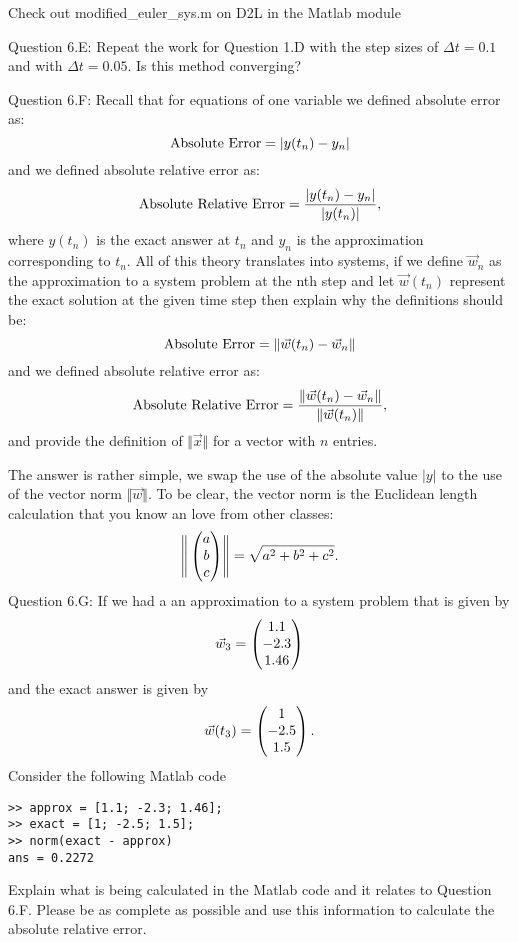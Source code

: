 \documentclass{article}
\def\ds{\displaystyle}
\begin{document}
{\color{teal}Check out modified\_euler\_sys.m on D2L in the Matlab module}
\par \medskip \noindent 
%
Question 6.E: Repeat the work for Question 1.D with the step sizes of $\Delta t = 0.1$ and with $\Delta t = 0.05$. Is this method converging?
\par \medskip \noindent 
%
Question 6.F: Recall that for equations of one variable we defined absolute error as:
$${\rm Absolute \ Error}=\vert y(t_n)-y_n\vert$$
and we defined absolute relative error as:
$${\rm Absolute \ Relative \ Error} =  \frac {\vert y(t_n)-y_n\vert}{\vert y(t_n)\vert},$$
where $\ds y(t_n)$ is the exact answer at $\ds t_n$ and $\ds y_n$ is the approximation corresponding to $\ds t_n$. All of this theory translates into systems, if we define $\ds \vec w_n$ as the approximation to a system problem at the nth step and let $\ds \vec w(t_n)$ represent the exact solution at the given time step then explain why the definitions should be:
$${\rm Absolute \ Error}=\Vert \vec w(t_n)-\vec w_n\Vert$$
and we defined absolute relative error as:
$${\rm Absolute \ Relative \ Error} =  \frac {\Vert \vec w(t_n)-\vec w_n\Vert}{\Vert \vec w(t_n)\Vert},$$
and provide the definition of $\ds \Vert \vec x \Vert$ for a vector with $n$ entries. 
\par \medskip \noindent 
{\color{teal} The answer is rather simple, we swap the use of the absolute value $\ds \vert y \vert$ to the use of the vector norm $\ds \Vert \vec w \Vert$. To be clear, the vector norm is the Euclidean length calculation that you know an love from other classes: 
$$\ds \Biggr \Vert \begin{pmatrix} a \cr b \cr c \end{pmatrix} \Biggr \Vert = \sqrt{a^2+b^2+c^2}.$$ }
%
Question 6.G: If we had a an approximation to a system problem that is given by
$$\vec w_3 = \begin{pmatrix} 1.1 \cr -2.3 \cr 1.46 \end{pmatrix}$$
and the exact answer is given by
$$\vec w(t_3) = \begin{pmatrix} 1 \cr -2.5 \cr 1.5 \end{pmatrix}.$$
Consider the following Matlab code
\begin{verbatim}
>> approx = [1.1; -2.3; 1.46];
>> exact = [1; -2.5; 1.5];
>> norm(exact - approx)
ans = 0.2272    
\end{verbatim}
Explain what is being calculated in the Matlab code and it relates to Question 6.F. Please be as complete as possible and use this information to calculate the absolute relative error. \par \medskip \noindent 
\end{document}
